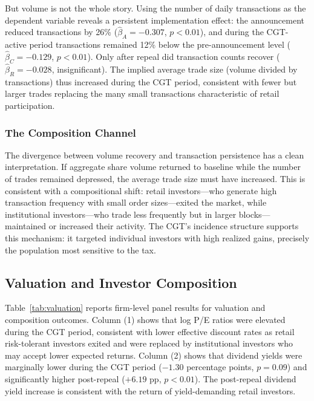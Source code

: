 \documentclass[12pt]{article}
\begin{document}
But volume is not the whole story. Using the number of daily transactions as the dependent variable reveals a persistent implementation effect: the announcement reduced transactions by 26\% ($\hat{\beta}_A = -0.307$, $p < 0.01$), and during the CGT-active period transactions remained 12\% below the pre-announcement level ($\hat{\beta}_C = -0.129$, $p < 0.01$). Only after repeal did transaction counts recover ($\hat{\beta}_R = -0.028$, insignificant). The implied average trade size (volume divided by transactions) thus increased during the CGT period, consistent with fewer but larger trades replacing the many small transactions characteristic of retail participation.

\subsubsection*{The Composition Channel} The divergence between volume recovery and transaction persistence has a clean interpretation. If aggregate share volume returned to baseline while the number of trades remained depressed, the average trade size must have increased. This is consistent with a compositional shift: retail investors---who generate high transaction frequency with small order sizes---exited the market, while institutional investors---who trade less frequently but in larger blocks---maintained or increased their activity. The CGT's incidence structure supports this mechanism: it targeted individual investors with high realized gains, precisely the population most sensitive to the tax.


\subsection{Valuation and Investor Composition}



Table~\ref{tab:valuation} reports firm-level panel results for valuation and composition outcomes. Column (1) shows that log P/E ratios were elevated during the CGT period, consistent with lower effective discount rates as retail risk-tolerant investors exited and were replaced by institutional investors who may accept lower expected returns. Column (2) shows that dividend yields were marginally lower during the CGT period ($-1.30$ percentage points, $p = 0.09$) and significantly higher post-repeal ($+6.19$ pp, $p < 0.01$). The post-repeal dividend yield increase is consistent with the return of yield-demanding retail investors.
\end{document}

